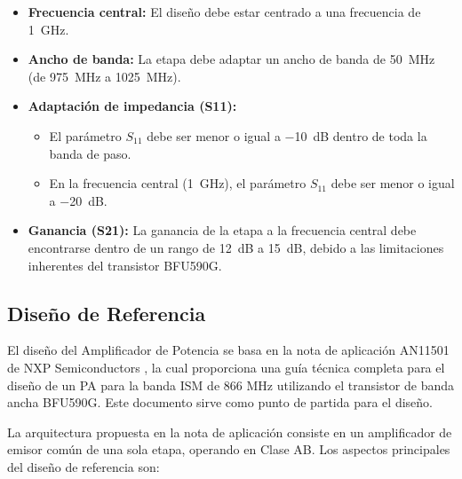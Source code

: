\begin{itemize}
    \item \textbf{Frecuencia central:} El diseño debe estar centrado a una frecuencia de \qty{1}{\GHz}.
    
    \item \textbf{Ancho de banda:} La etapa debe adaptar un ancho de banda de \qty{50}{\MHz} (de \qty{975}{\MHz} a \qty{1025}{\MHz}).
    
    \item \textbf{Adaptación de impedancia (S11):} 
    \begin{itemize}
        \item El parámetro $S_{11}$ debe ser menor o igual a \qty{-10}{\dB} dentro de toda la banda de paso.
        \item En la frecuencia central (\qty{1}{\GHz}), el parámetro $S_{11}$ debe ser menor o igual a \qty{-20}{\dB}.
    \end{itemize}
    
    \item \textbf{Ganancia (S21):} La ganancia de la etapa a la frecuencia central debe encontrarse dentro de un rango de \qty{12}{\dB} a \qty{15}{\dB}, debido a las limitaciones inherentes del transistor BFU590G.
\end{itemize}

\subsection{Diseño de Referencia}

El diseño del Amplificador de Potencia se basa en la nota de aplicación AN11501 de NXP Semiconductors \cite{nxp_an11501}, la cual proporciona una guía técnica completa para el diseño de un PA para la banda ISM de 866 MHz utilizando el transistor de banda ancha BFU590G. Este documento sirve como punto de partida para el diseño.

La arquitectura propuesta en la nota de aplicación consiste en un amplificador de emisor común de una sola etapa, operando en Clase AB. Los aspectos principales del diseño de referencia son:

